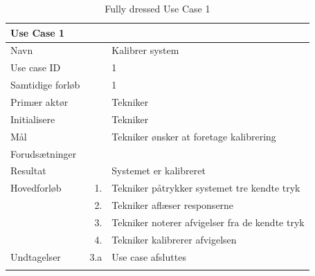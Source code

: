 \begin{longtabu} to  %
    {\large \textbf{Use Case 1}} && \\
    \toprule
    Navn &&    Kalibrer system\\
    Use case ID &&    1\\
    Samtidige forløb &&    1\\
    Primær aktør &&    Tekniker\\
    Initialisere &&    Tekniker\\
    Mål && Tekniker ønsker at foretage kalibrering\\
    Forudsætninger &&  \\
    Resultat &&    Systemet er kalibreret                     \\ \midrule
    Hovedforløb &    1. &    Tekniker påtrykker systemet tre kendte tryk  \\
    			&    2. &    Tekniker aflæser responserne  \\ 
    			&    3. &    Tekniker noterer afvigelser fra de kendte tryk   \\
    			&    4. &    Tekniker kalibrerer afvigelsen  \\ \midrule 		
    Undtagelser &    3.a & Use case afsluttes \\ \bottomrule
\caption{Fully dressed Use Case 1}
\label{UC1}
\end{longtabu}

